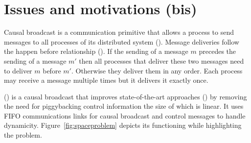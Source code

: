 
\section{Issues and motivations (bis)}

Causal broadcast is a communication primitive that allows a process to send
messages to all processes of its distributed system (\REF). Message deliveries
follow the happen before relationship (\REF). If the sending of a message $m$
precedes the sending of a message $m'$ then all processes that deliver these two
messages need to deliver $m$ before $m'$. Otherwise they deliver them in any
order. Each process may receive a message multiple times but it delivers it
exactly once.

\PCBROADCAST (\REF) is a causal broadcast that improves state-of-the-art
approaches (\REF) by removing the need for piggybacking control information the
size of which is linear. It uses FIFO communications links for causal broadcast
and control messages to handle dynamicity.  Figure~\ref{fig:spaceproblem}
depicts its functioning while highlighting the problem. 



